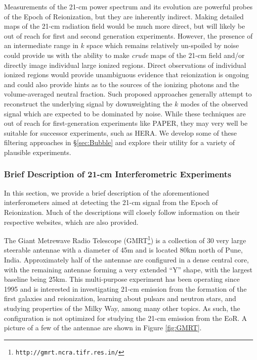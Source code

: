 Measurements of the 21-cm power spectrum and its evolution are powerful probes of the Epoch of Reionization, but they are inherently indirect. Making detailed maps of the 21-cm radiation field would be much more direct, but will likely be out of reach for first and second generation experiments. However, the presence of an intermediate range in $k$ space which remains relatively un-spoiled by noise could provide us with the ability to make \textit{crude} maps of the 21-cm field and/or directly image individual large ionized regions. Direct observations of individual ionized regions would provide unambiguous evidence that reionization is ongoing and could also provide hints as to the sources of the ionizing photons and the volume-averaged neutral fraction. Such proposed approaches generally attempt to reconstruct the underlying signal by downweighting the $k$ modes of the observed signal which are expected to be dominated by noise. While these techniques are out of reach for first-generation experiments like PAPER, they may very well be suitable for successor experiments, such as HERA. We develop some of these filtering approaches in \S \ref{sec:Bubble} and explore their utility for a variety of plausible experiments.


\clearpage 
\subsubsection{Brief Description of 21-cm Interferometric Experiments}\label{sec:21cmExperiments}


In this section, we provide a brief description of the aforementioned interferometers aimed at detecting the 21-cm signal from the Epoch of Reionization. Much of the descriptions will closely follow information on their respective websites, which are also provided.


The Giant Metrewave Radio Telescope (GMRT\footnote{{\tt http://gmrt.ncra.tifr.res.in/}}) is a collection of 30 very large steerable antennae with a diameter of 45m and is located 80km north of Pune, India. Approximately half of the antennae are configured in a dense central core, with the remaining antennae forming a very extended ``Y'' shape, with the largest baseline being 25km. This multi-purpose experiment has been operating since 1995 and is interested in investigating 21-cm emission from the formation of the first galaxies and reionization, learning about pulsars and neutron stars, and studying properties of the Milky Way, among many other topics. As such, the configuration is not optimized for studying the 21-cm emission from the EoR. A picture of a few of the antennae are shown in Figure \ref{fig:GMRT}.

